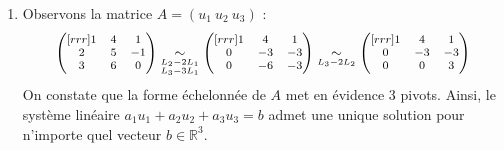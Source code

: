 \documentclass[a4paper, 10pt]{report}
\begin{document}
	\colorbox{solution}
	{\begin{minipage}{0.9\textwidth}
		\begin{enumerate}[label=(\roman*)]
			\item Observons la matrice $A = (u_1\ u_2\ u_3)$ :
			\[\footnotesize
			\begin{pmatrix}[rrr]
				1 & 4 & 1\\
				2 & 5 & -1\\
				3 & 6 & 0
			\end{pmatrix}
			\underset{\substack{L_2 - 2L_1 \\ L_3 - 3L_1}}{\sim}
			\begin{pmatrix}[rrr]
				1 & 4 & 1\\
				0 & -3 & -3\\
				0 & -6 & -3
			\end{pmatrix}
			\underset{\substack{L_3 - 2L_2}}{\sim}
			\begin{pmatrix}[rrr]
				1 & 4 & 1\\
				0 & -3 & -3\\
				0 & 0 & 3
			\end{pmatrix}\]
			On constate que la forme échelonnée de $A$ met en évidence
			3 pivots. Ainsi, le système linéaire
			$a_1u_1 + a_2u_2 +a_3u_3 = b$ admet une unique solution pour
			n'importe quel vecteur $b \in \mathbb{R}^3$.\\
			

\end{enumerate}
\end{minipage}}
\end{document}
